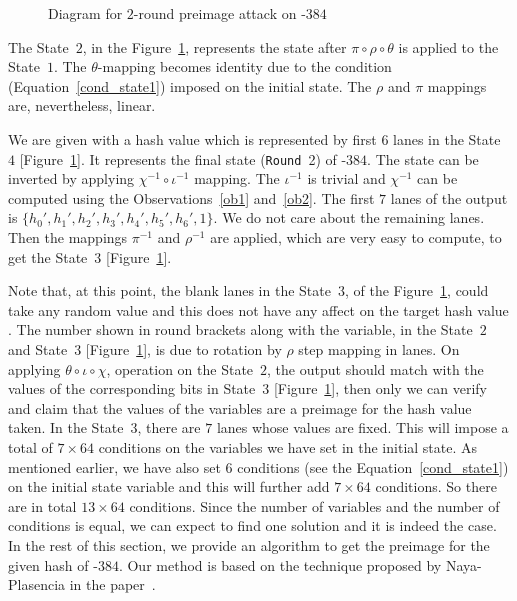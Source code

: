 \begin{figure}[!t]
\begin{center}
{
}
\caption{Diagram for $2$-round preimage attack on \Keccak-$384$ \label{atk}}
\end{center}
\end{figure}
The State~$2$, in the Figure~\ref{atk}, represents the state after $\pi \circ \rho \circ \theta$ is applied to the State~$1$. 
The $\theta$-mapping becomes identity due to the condition
(Equation~\ref{cond_state1}) imposed on the initial state. 
The $\rho$ and $\pi$ mappings are, nevertheless, linear.

We are given with a hash value which is represented by first $6$ lanes in the State~$4$ [Figure~\ref{atk}]. It represents the final state ({\tt Round}~2) of \Keccak-$384$. The state can be inverted by applying $\chi^{-1} \circ \iota^{-1}$ mapping. The $\iota^{-1}$ is trivial and $\chi^{-1}$ can be computed using the Observations~\ref{ob1} and~\ref{ob2}. The first $7$ lanes of the output is $\{h_0',h_1',h_2',h_3',h_4',h_5',h_6',1\}$. We do not care about the remaining  lanes. 
Then the mappings $\pi^{-1}$ and $\rho^{-1}$ are applied, which are very easy to compute, to get the State~$3$ [Figure~\ref{atk}]. 

Note that, at this point, the blank lanes in the State~$3$, of the Figure~\ref{atk}, could take any random value and this does not have any affect on the target hash value
.
The number shown in round brackets along with the variable, in the State~$2$ and State~$3$ [Figure~\ref{atk}], is due to rotation by $\rho$ step mapping in lanes.
On applying $\theta \circ \iota \circ \chi$, operation on the State~$2$, the output should match with the values of the corresponding bits in State~$3$ [Figure~\ref{atk}], then only we can verify and claim that the values of the variables are a preimage for the hash value taken. In the State~$3$, there are $7$ lanes whose values are fixed. 
This will impose a total of $7\times 64$ conditions on the variables we have set in the initial state. As mentioned earlier, we have also set $6$ conditions (see the Equation~\ref{cond_state1}) on the initial state variable and this will further add $7 \times 64$ conditions. So there are in total $13\times 64$ conditions. Since the number of variables and the number of conditions is equal, we can expect to find one solution and it is indeed the case. In the rest of this section, we provide an algorithm to get the preimage for the given hash of \KECCAK-$384$. Our method is based on the technique proposed by Naya-Plasencia \etal in the paper~\cite{naya2011practical}.


